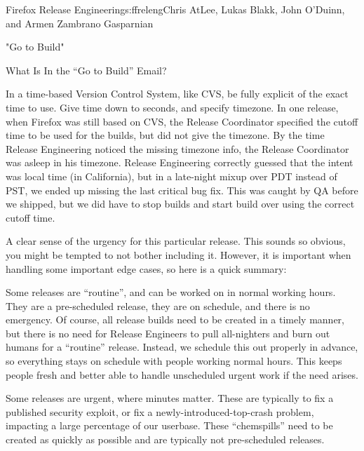 \begin{aosachapter}{Firefox Release Engineering}{s:ffreleng}{Chris AtLee, Lukas Blakk, John O'Duinn, and Armen Zambrano Gasparnian}
\begin{aosasect1}{"Go to Build"}
\begin{aosasect2}{What Is In the ``Go to Build'' Email?}
\begin{aosaenumerate}
\begin{aosaenumerate}
    \item In a time-based Version Control System, like CVS, be fully
      explicit of the exact time to use. Give time down to seconds,
      and specify timezone. In one release, when Firefox was still
      based on CVS, the Release Coordinator specified the cutoff time
      to be used for the builds, but did not give the timezone. By the
      time Release Engineering noticed the missing timezone info, the
      Release Coordinator was asleep in his timezone. Release
      Engineering correctly guessed that the intent was local time (in
      California), but in a late-night mixup over PDT instead of PST,
      we ended up missing the last critical bug fix. This was caught
      by QA before we shipped, but we did have to stop builds and
      start build over using the correct cutoff time.

    \end{aosaenumerate}

\item A clear sense of the urgency for this particular release.  This
  sounds so obvious, you might be tempted to not bother including
  it. However, it is important when handling some important edge
  cases, so here is a quick summary:

  \begin{aosaenumerate}

    \item Some releases are ``routine'', and can be worked on in
      normal working hours. They are a pre-scheduled release, they are
      on schedule, and there is no emergency. Of course, all release
      builds need to be created in a timely manner, but there is no
      need for Release Engineers to pull all-nighters and burn out
      humans for a ``routine'' release.  Instead, we schedule this out
      properly in advance, so everything stays on schedule with people
      working normal hours. This keeps people fresh and better able to
      handle unscheduled urgent work if the need arises.

    \item Some releases are urgent, where minutes matter. These are
      typically to fix a published security exploit, or fix a
      newly-introduced-top-crash problem, impacting a large percentage
      of our userbase. These ``chemspills'' need to be created as
      quickly as possible and are typically not pre-scheduled
      releases.


\end{aosaenumerate}
\end{aosaenumerate}
\end{aosasect2}
\end{aosasect1}
\end{aosachapter}
